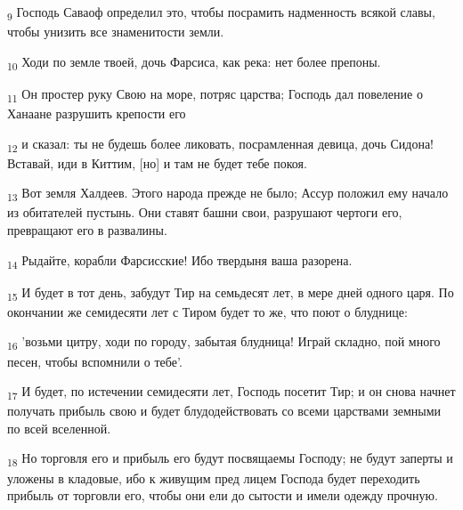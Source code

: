 \begin{tcolorbox}
\textsubscript{9} Господь Саваоф определил это, чтобы посрамить надменность всякой славы, чтобы унизить все знаменитости земли.
\end{tcolorbox}
\begin{tcolorbox}
\textsubscript{10} Ходи по земле твоей, дочь Фарсиса, как река: нет более препоны.
\end{tcolorbox}
\begin{tcolorbox}
\textsubscript{11} Он простер руку Свою на море, потряс царства; Господь дал повеление о Ханаане разрушить крепости его
\end{tcolorbox}
\begin{tcolorbox}
\textsubscript{12} и сказал: ты не будешь более ликовать, посрамленная девица, дочь Сидона! Вставай, иди в Киттим, [но] и там не будет тебе покоя.
\end{tcolorbox}
\begin{tcolorbox}
\textsubscript{13} Вот земля Халдеев. Этого народа прежде не было; Ассур положил ему начало из обитателей пустынь. Они ставят башни свои, разрушают чертоги его, превращают его в развалины.
\end{tcolorbox}
\begin{tcolorbox}
\textsubscript{14} Рыдайте, корабли Фарсисские! Ибо твердыня ваша разорена.
\end{tcolorbox}
\begin{tcolorbox}
\textsubscript{15} И будет в тот день, забудут Тир на семьдесят лет, в мере дней одного царя. По окончании же семидесяти лет с Тиром будет то же, что поют о блуднице:
\end{tcolorbox}
\begin{tcolorbox}
\textsubscript{16} 'возьми цитру, ходи по городу, забытая блудница! Играй складно, пой много песен, чтобы вспомнили о тебе'.
\end{tcolorbox}
\begin{tcolorbox}
\textsubscript{17} И будет, по истечении семидесяти лет, Господь посетит Тир; и он снова начнет получать прибыль свою и будет блудодействовать со всеми царствами земными по всей вселенной.
\end{tcolorbox}
\begin{tcolorbox}
\textsubscript{18} Но торговля его и прибыль его будут посвящаемы Господу; не будут заперты и уложены в кладовые, ибо к живущим пред лицем Господа будет переходить прибыль от торговли его, чтобы они ели до сытости и имели одежду прочную.
\end{tcolorbox}
